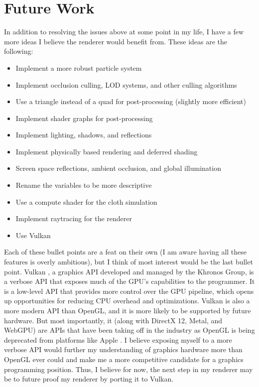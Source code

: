 \documentclass[letterpaper, 10 pt, conference]{ieeeconf}  %
\begin{document}
\section {Future Work}
In addition to resolving the issues above at some point in my life, I have a few more ideas I believe the renderer would benefit from. These ideas are the following:
\begin{itemize}
        \item Implement a more robust particle system
        \item Implement occlusion culling, LOD systems, and other culling algorithms
        \item Use a triangle instead of a quad for post-processing (slightly more efficient)
        \item Implement shader graphs for post-processing
        \item Implement lighting, shadows, and reflections
        \item Implement physically based rendering and deferred shading
        \item Screen space reflections, ambient occlusion, and global illumination
        \item Rename the variables to be more descriptive
        \item Use a compute shader for the cloth simulation
        \item Implement raytracing for the renderer
        \item Use Vulkan
\end{itemize}

Each of these bullet points are a feat on their own (I am aware having all these features is overly ambitious), but I think of most interest would be the last bullet point. Vulkan \cite{Vulkan2024}, a graphics API developed and managed by the Khronos Group, is a verbose API that exposes much of the GPU's capabilities to the programmer. It is a low-level API that provides more control over the GPU pipeline, which opens up opportunities for reducing CPU overhead and optimizations. Vulkan is also a more modern API than OpenGL, and it is more likely to be supported by future hardware. But most importantly, it (along with DirectX 12, Metal, and WebGPU) are APIs that have been taking off in the industry as OpenGL is being deprecated from platforms like Apple \cite{Horwitz_2018}. I believe exposing myself to a more verbose API would further my understanding of graphics hardware more than OpenGL ever could and make me a more competitive candidate for a graphics programming position. Thus, I believe for now, the next step in my renderer may be to future proof my renderer by porting it to Vulkan.
\end{document}
